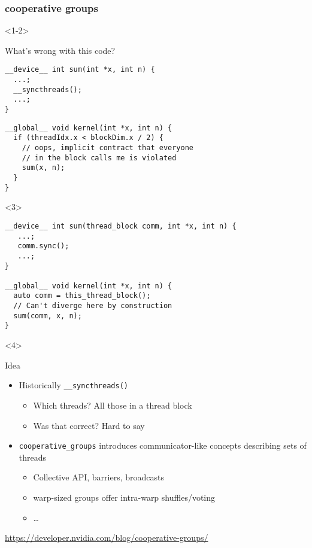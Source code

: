 \documentclass[aspectratio=169]{beamer}
\begin{document}
\begin{frame}[fragile]
  \frametitle{cooperative groups}

  \begin{onlyenv}<1-2>
    \begin{block}{What's wrong with this code?}
\begin{verbatim}
__device__ int sum(int *x, int n) {
  ...;
  __syncthreads();
  ...;
}
\end{verbatim}
      \pause
\begin{verbatim}
__global__ void kernel(int *x, int n) {
  if (threadIdx.x < blockDim.x / 2) {
    // oops, implicit contract that everyone
    // in the block calls me is violated
    sum(x, n);
  }
}
\end{verbatim}
    \end{block}
  \end{onlyenv}
  \pause
  \begin{onlyenv}<3>
\begin{verbatim}
__device__ int sum(thread_block comm, int *x, int n) {
   ...;
   comm.sync();
   ...;
}

__global__ void kernel(int *x, int n) {
  auto comm = this_thread_block();
  // Can't diverge here by construction
  sum(comm, x, n);
}
\end{verbatim}
  \end{onlyenv}
  \begin{onlyenv}<4>
    \begin{block}{Idea}
      \begin{itemize}
      \item Historically \verb~__syncthreads()~
        \begin{itemize}
        \item Which threads? All those in a thread block
        \item Was that correct? Hard to say
        \end{itemize}
      \item \verb~cooperative_groups~ introduces communicator-like
        concepts describing sets of threads
        \begin{itemize}
        \item Collective API, barriers, broadcasts
        \item warp-sized groups offer intra-warp shuffles/voting
        \item \dots
        \end{itemize}
      \end{itemize}
    \end{block}
    {
      \scriptsize
      \raggedleft
      \url{https://developer.nvidia.com/blog/cooperative-groups/}
      \par
    }
  \end{onlyenv}
\end{frame}
\end{document}
